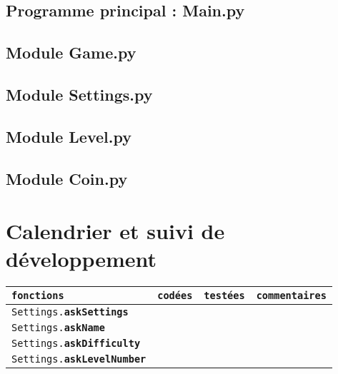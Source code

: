 \documentclass[a4paper,11pt]{article}
\begin{document}
\subsection{Programme principal : Main.py}

\begin{alltt}
	
\end{alltt}
\newpage
\subsection{Module Game.py}

\begin{alltt}

\end{alltt}
\newpage
\subsection{Module Settings.py}

\begin{alltt}
	
\end{alltt}

\subsection{Module Level.py}
\begin{alltt}
	
\end{alltt}

\newpage
\subsection{Module Coin.py}

\begin{alltt}

\end{alltt}

\section{Calendrier et suivi de développement}

\begin{tabular}{|l|c|c|l|}
\hline
\texttt{fonctions} & \texttt{codées} & \texttt{testées} & \texttt{commentaires} \\
\hline
	\texttt{Settings.\textbf{askSettings}} & & & \\
\hline
	\texttt{Settings.\textbf{askName}} & & & \\
\hline
	\texttt{Settings.\textbf{askDifficulty}} & & & \\
\hline 
	\texttt{Settings.\textbf{askLevelNumber}} & & & \\
\hline
\end{tabular}
\end{document}
